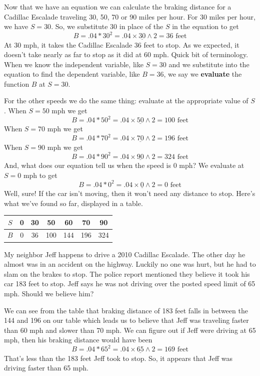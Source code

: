 Now that we have an equation we can calculate the braking distance for a Cadillac Escalade traveling 30, 50, 70 or 90 miles per hour.  For 30 miles per hour, we have $S=30$.  So, we substitute 30 in place of the $S$ in the equation to get 
$$B = .04 \ast 30^2 = .04\times \underline{30} \wedge 2 = 36 \text{ feet}$$  
At 30 mph, it takes the Cadillac Escalade 36 feet to stop.  As we expected, it doesn't take nearly as far to stop as it did at 60 mph. 
Quick bit of terminology.  When we know the independent variable, like $S=30$ and we substitute into the equation to find the dependent variable, like $B=36$, we say we \textbf{evaluate} the function $B$ at $S=30$.

For the other speeds we do the same thing:  evaluate at the appropriate value of  $S$.  When  $S=50$ mph we get
$$B = .04 \ast 50^2 = .04\times \underline{50}\wedge2 = 100 \text{ feet}$$ 
When $S=70$ mph we get
$$B = .04 \ast 70^2 = .04\times \underline{70}\wedge2 = 196\text{ feet}$$ 
When $S=90$ mph we get
$$B = .04 \ast 90^2 = .04\times \underline{90}\wedge2 = 324 \text{ feet}$$ 
And, what does our equation tell us when the speed is 0 mph?  We evaluate at $S=0$ mph to get  $$B = .04 \ast 0^2 = .04\times \underline{0} \wedge 2 = 0 \text{ feet}$$ 
Well, sure!  If the car isn't moving, then it won't need any distance to stop.
Here's what we've found so far, displayed in a table.
\begin{center}
\begin{tabular} {|c| |c|c |c|c|c |c|} \hline
$S$ & 0 & 30 & 50 & 60 & 70 & 90 \\ \hline
$B$ & 0 & 36 & 100 & 144 & 196 & 324 \\ \hline
\end{tabular}
\end{center}

My neighbor Jeff happens to drive a 2010 Cadillac Escalade.  The other day he almost was in an accident on the highway.  Luckily no one was hurt, but he had to slam on the brakes to stop.  The police report mentioned they believe it took his car 183 feet to stop.  Jeff says he was not driving over the posted speed limit of 65 mph.  Should we believe him?

We can see from the table that braking distance of 183 feet falls in between the 144 and 196 on our table which leads us to believe that Jeff was traveling faster than 60 mph and slower than 70 mph.  We can figure out if Jeff were driving at 65 mph, then his braking distance would have been 
$$B = .04 \ast 65^2 = .04\times \underline{65} \wedge 2 = 169 \text{ feet}$$  That's less than the 183 feet Jeff took to stop.  So, it appears that Jeff was driving faster than 65 mph. 

